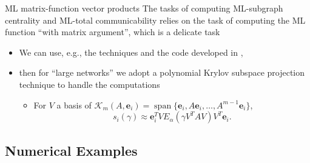 \documentclass[aspectratio=169,xcolor=dvipsnames]{beamer}
\begin{document}
\begin{frame}{\faCalculator\; ML matrix-function vector products}
The tasks of computing \alert{ML-subgraph centrality} and \alert{ML-total communicability} relies on the task of computing the ML function ``with matrix argument'', which is a delicate task 
\begin{itemize}
	\item[\faFile] We can use, e.g., the techniques and the code developed in \parencite{MatrixML},
	\item[\faHandPointRight] then for ``large networks'' we adopt a polynomial Krylov subspace projection technique \parencite{MoretNovatiML} to handle the computations
	\begin{itemize}
		\item \normalsize For $V$ a basis of $\mathcal{K}_m(A,\mathbf{e}_i) = \operatorname{span}\{\mathbf{e}_i,A\mathbf{e}_i,\ldots,A^{m-1}\mathbf{e}_i\}$,
		\[ s_i(\gamma) \approx \mathbf{e}_{i}^T V E_\alpha(\gamma V^T A V) V^T\mathbf{e}_{i}.  \]
	\end{itemize}
\end{itemize}
\end{frame}

\subsection{Numerical Examples}
\end{document}
